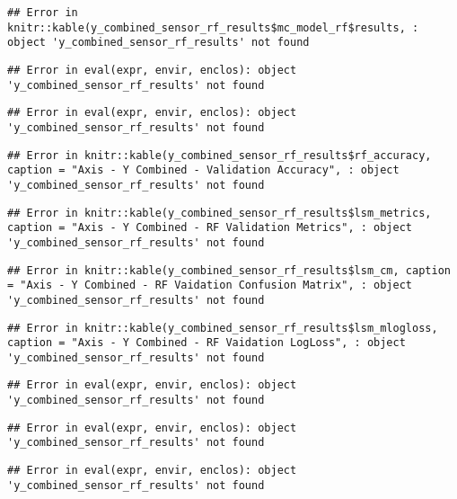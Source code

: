 \documentclass[]{article}
\begin{document}
\begin{verbatim}
## Error in knitr::kable(y_combined_sensor_rf_results$mc_model_rf$results, : object 'y_combined_sensor_rf_results' not found
\end{verbatim}

\begin{verbatim}
## Error in eval(expr, envir, enclos): object 'y_combined_sensor_rf_results' not found
\end{verbatim}

\begin{verbatim}
## Error in eval(expr, envir, enclos): object 'y_combined_sensor_rf_results' not found
\end{verbatim}

\begin{verbatim}
## Error in knitr::kable(y_combined_sensor_rf_results$rf_accuracy, caption = "Axis - Y Combined - Validation Accuracy", : object 'y_combined_sensor_rf_results' not found
\end{verbatim}

\begin{verbatim}
## Error in knitr::kable(y_combined_sensor_rf_results$lsm_metrics, caption = "Axis - Y Combined - RF Validation Metrics", : object 'y_combined_sensor_rf_results' not found
\end{verbatim}

\begin{verbatim}
## Error in knitr::kable(y_combined_sensor_rf_results$lsm_cm, caption = "Axis - Y Combined - RF Vaidation Confusion Matrix", : object 'y_combined_sensor_rf_results' not found
\end{verbatim}

\begin{verbatim}
## Error in knitr::kable(y_combined_sensor_rf_results$lsm_mlogloss, caption = "Axis - Y Combined - RF Vaidation LogLoss", : object 'y_combined_sensor_rf_results' not found
\end{verbatim}

\begin{verbatim}
## Error in eval(expr, envir, enclos): object 'y_combined_sensor_rf_results' not found
\end{verbatim}

\begin{verbatim}
## Error in eval(expr, envir, enclos): object 'y_combined_sensor_rf_results' not found
\end{verbatim}

\begin{verbatim}
## Error in eval(expr, envir, enclos): object 'y_combined_sensor_rf_results' not found
\end{verbatim}
\end{document}
